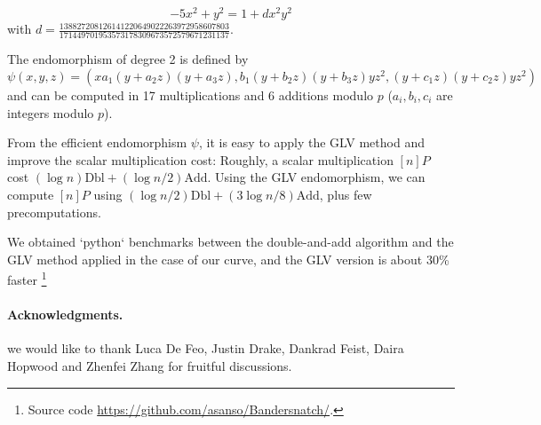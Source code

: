 \documentclass{amsart}
\begin{document}
$$-5x^2+y^2 = 1+dx^2y^2$$ with
$d=\frac{138827208126141220649022263972958607803}{171449701953573178309673572579671231137}$.

\medskip
The endomorphism of degree 2 is defined by
$$\psi(x,y,z) = (xa_1(y+a_2z)(y+a_3z), b_1(y+b_2z)(y+b_3z)yz^2, (y+c_1z)(y+c_2z)yz^2)$$
and can be computed in 17 multiplications and 6 additions modulo $p$ ($a_i, b_i, c_i$ are integers modulo $p$).

From the efficient endomorphism $\psi$, it is easy to apply the GLV method and improve the scalar multiplication cost:
Roughly, a scalar multiplication $[n]P$ cost $(\log n) \text{Dbl} + (\log n/2) \text{Add}$.
Using the GLV endomorphism, we can compute $[n]P$ using $(\log n/2 )\text{Dbl} + (3\log n/8) \text{Add}$, plus few precomputations.

We obtained `python` benchmarks between the double-and-add algorithm and the GLV method applied in the case of our curve, and the GLV version is about 30\% faster 
\footnote{Source code \url{https://github.com/asanso/Bandersnatch/}.}

\bigskip
\paragraph*{\textbf{Acknowledgments.}} we would like to thank Luca De Feo, Justin Drake, Dankrad Feist, Daira Hopwood and Zhenfei Zhang for fruitful discussions.

{}

\end{document}
